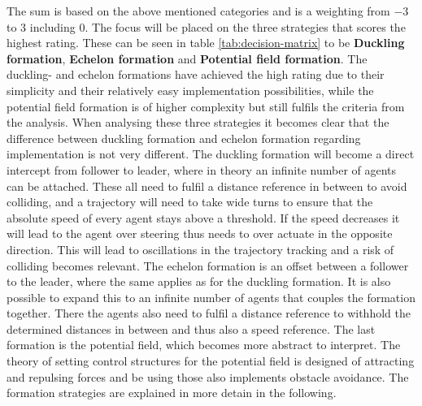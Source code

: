 The sum is based on the above mentioned categories and is a weighting from $-3$ to $3$ including $0$. The focus will be placed on the three strategies that scores the highest rating. These can be seen in table \ref{tab:decision-matrix} to be \textbf{Duckling formation}, \textbf{Echelon formation} and \textbf{Potential field formation}. The duckling- and echelon formations have achieved the high rating due to their simplicity and their relatively easy implementation possibilities, while the potential field formation is of higher complexity but still fulfils the criteria from the analysis. When analysing these three strategies it becomes clear that the difference between duckling formation and echelon formation regarding implementation is not very different. The duckling formation will become a direct intercept from follower to leader, where in theory an infinite number of agents can be attached. These all need to fulfil a distance reference in between to avoid colliding, and a trajectory will need to take wide turns to ensure that the absolute speed of every agent stays above a threshold. If the speed decreases it will lead to the agent over steering thus needs to over actuate in the opposite direction. This will lead to oscillations in the trajectory tracking and a risk of colliding becomes relevant. The echelon formation is an offset between a follower to the leader, where the same applies as for the duckling formation. It is also possible to expand this to an infinite number of agents that couples the formation together. There the agents also need to fulfil a distance reference to withhold the determined distances in between and thus also a speed reference. The last formation is the potential field, which becomes more abstract to interpret. The theory of setting control structures for the potential field is designed of attracting and repulsing forces and be using those also implements obstacle avoidance. The formation strategies are explained in more detain in the following.






